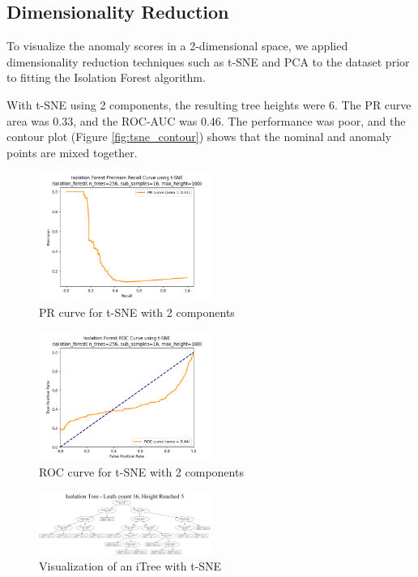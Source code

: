 \subsection{Dimensionality Reduction}
To visualize the anomaly scores in a 2-dimensional space, we applied dimensionality reduction techniques such as t-SNE and PCA to the dataset prior to fitting the Isolation Forest algorithm.

With t-SNE using 2 components, the resulting tree heights were 6. The PR curve area was 0.33, and the ROC-AUC was 0.46. The performance was poor, and the contour plot (Figure \ref{fig:tsne_contour}) shows that the nominal and anomaly points are mixed together.

\begin{figure}[htbp]
\centering
\includegraphics[width=0.5\textwidth]{resources/images/scratch_tsne_pr_curve.png}
\caption{PR curve for t-SNE with 2 components}
\label{fig:tsne_pr}
\end{figure}

\begin{figure}[htbp]
\centering
\includegraphics[width=0.5\textwidth]{resources/images/scratch_tsne_roc_curve.png}
\caption{ROC curve for t-SNE with 2 components}
\label{fig:tsne_roc}
\end{figure}

\begin{figure}[htbp]
\centering
\includegraphics[width=0.5\textwidth]{resources/images/itree_tsne_graph.png}
\caption{Visualization of an iTree with t-SNE}
\label{fig:tsne_itree}
\end{figure}

